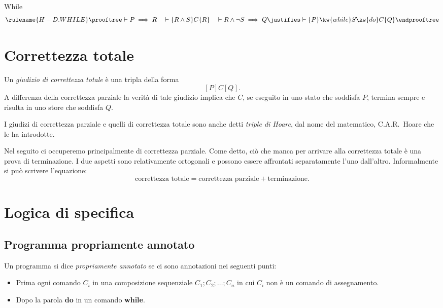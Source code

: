 While
\[
  \rulename {H-D.WHILE}
  \prooftree
    \vdash P \implies R
    \quad
    \vdash \{R \land S\} C \{R\}
    \quad
    \vdash R \land \neg S \implies Q
   \justifies
     \vdash \{P\}\kw{while} S \kw{do} C \{Q\}
  \endprooftree
\]

\section{Correttezza totale}
\begin{definizione}
Un \emph{giudizio di correttezza totale} è una tripla della forma
\[
  [P] C [Q].
\]
A differenza della correttezza parziale la verità di tale giudizio
implica che $C$, se eseguito in uno stato che soddisfa $P$,
termina sempre e risulta in uno store che soddisfa $Q$.
\end{definizione}

I giudizi di correttezza parziale e quelli di correttezza totale
sono anche detti \emph{triple di Hoare}, dal nome del matematico,
C.A.R.\ Hoare che le ha introdotte.

Nel seguito ci occuperemo principalmente di correttezza parziale.
Come detto, ciò che manca per arrivare alla correttezza totale
è una prova di terminazione.  I due aspetti sono relativamente
ortogonali e possono essere affrontati separatamente l'uno
dall'altro.  Informalmente si può scrivere l'equazione:
\[
  \textrm{correttezza totale}
    = \textrm{correttezza parziale} + \textrm{terminazione}.
\]

\section{Logica di specifica}


\subsection{Programma propriamente annotato}
\begin{definizione}
Un programma si dice \emph{propriamente annotato} se ci sono annotazioni nei seguenti punti:
\begin{itemize}
        \item Prima ogni comando $C_i$ in una composizione sequenziale $C_1;C_2; \dots ;C_n$ in cui $C_i$ non è un comando di assegnamento.
        \item Dopo la parola \textbf{do} in un comando \textbf{while}.
\end{itemize}
\end{definizione}


